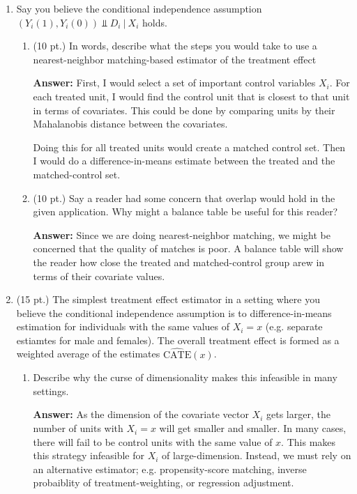 \documentclass[12pt]{article}
\newcommand{\answer}[1]{{\color{blue_winged_teal}\textbf{Answer:} #1}}
\newcommand{\pts}[1]{{\color{zinc500}#1}}
\begin{document}
\begin{enumerate}
  \medskip
  \item Say you believe the conditional independence assumption $(Y_i(1), Y_i(0)) \Perp D_i \ \vert \ X_i$ holds. 
  \begin{enumerate}
    \item \pts{(10 pt.)} In words, describe what the steps you would take to use a nearest-neighbor matching-based estimator of the treatment effect
    
    \answer{
      First, I would select a set of important control variables $X_i$. For each treated unit, I would find the control unit that is closest to that unit in terms of covariates. This could be done by comparing units by their Mahalanobis distance between the covariates. 

      Doing this for all treated units would create a matched control set. Then I would do a difference-in-means estimate between the treated and the matched-control set.
    }
    
    \item \pts{(10 pt.)} Say a reader had some concern that overlap would hold in the given application. Why might a balance table be useful for this reader? 
    
    \answer{
      Since we are doing nearest-neighbor matching, we might be concerned that the quality of matches is poor. A balance table will show the reader how close the treated and matched-control group arew in terms of their covariate values.
    }
  \end{enumerate}
  
  \medskip
  \item \pts{(15 pt.)} The simplest treatment effect estimator in a setting where you believe the conditional independence assumption is to difference-in-means estimation for individuals with the same values of $X_i = x$ (e.g. separate estiamtes for male and females). The overall treatment effect is formed as a weighted average of the estimates $\widehat{\text{CATE}}(x)$.
  \begin{enumerate}
    \item Describe why the curse of dimensionality makes this infeasible in many settings.
    
    \answer{
      As the dimension of the covariate vector $X_i$ gets larger, the number of units with $X_i = x$ will get smaller and smaller. In many cases, there will fail to be control units with the same value of $x$. This makes this strategy infeasible for $X_i$ of large-dimension. Instead, we must rely on an alternative estimator; e.g. propensity-score matching, inverse probaiblity of treatment-weighting, or regression adjustment.
    }
  \end{enumerate}
\end{enumerate}
\end{document}
